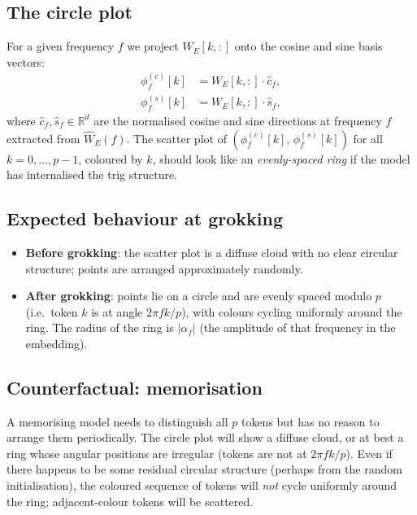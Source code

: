 \documentclass[11pt]{article}
\newcommand{\R}{\mathbb{R}}
\begin{document}
\subsection{The circle plot}

For a given frequency $f$ we project $W_E[k,:]$ onto the cosine and sine
basis vectors:
\begin{align}
    \phi^{(c)}_f[k] &= W_E[k,:]\cdot \hat{c}_f, \\
    \phi^{(s)}_f[k] &= W_E[k,:]\cdot \hat{s}_f,
\end{align}
where $\hat{c}_f,\hat{s}_f\in\R^d$ are the normalised cosine and sine
directions at frequency $f$ extracted from $\hat{W}_E(f)$.
The scatter plot of $(\phi^{(c)}_f[k],\,\phi^{(s)}_f[k])$ for all
$k=0,\dots,p-1$, coloured by $k$, should look like an \emph{evenly-spaced
ring} if the model has internalised the trig structure.

\subsection{Expected behaviour at grokking}

\begin{itemize}
    \item \textbf{Before grokking}: the scatter plot is a diffuse cloud with
    no clear circular structure; points are arranged approximately randomly.
    \item \textbf{After grokking}: points lie on a circle and are evenly
    spaced modulo $p$ (i.e.\ token $k$ is at angle $2\pi fk/p$), with
    colours cycling uniformly around the ring.
    The radius of the ring is $|\alpha_f|$ (the amplitude of that frequency
    in the embedding).
\end{itemize}

\subsection{Counterfactual: memorisation}

A memorising model needs to distinguish all $p$ tokens but has no reason
to arrange them periodically.
The circle plot will show a diffuse cloud, or at best a ring whose angular
positions are irregular (tokens are not at $2\pi fk/p$).
Even if there happens to be some residual circular structure (perhaps from
the random initialisation), the coloured sequence of tokens will \emph{not}
cycle uniformly around the ring; adjacent-colour tokens will be scattered.

\end{document}
